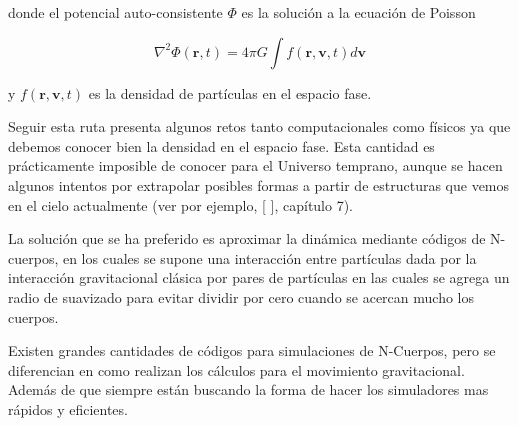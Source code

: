 \noindent donde el potencial auto-consistente $\Phi$ es la solución a la ecuación de Poisson

\begin{equation}
    \nabla^2\Phi(\mathbf{r},t) = 4\pi G \int f(\mathbf{r},\mathbf{v},t)d\mathbf{v}
    \label{eq:PoissonSol}
\end{equation}

\noindent y $f(\mathbf{r},\mathbf{v},t)$ es la densidad de partículas en el espacio fase.





Seguir esta ruta presenta algunos retos tanto computacionales como físicos ya que debemos conocer bien la densidad en el espacio fase. Esta cantidad es prácticamente imposible de conocer para el Universo temprano, aunque se hacen algunos intentos por extrapolar posibles formas a partir de estructuras que vemos en el cielo actualmente (ver por ejemplo, [\cite[Binney]{Binney1988-rs} ], capítulo 7). 

La solución que se ha preferido es aproximar la dinámica mediante códigos de N-cuerpos, en los cuales se supone una interacción entre partículas dada por la interacción gravitacional clásica por pares de partículas en las cuales se agrega un radio de suavizado para evitar dividir por cero cuando se acercan mucho los cuerpos. 

Existen grandes cantidades de códigos para simulaciones de N-Cuerpos, pero se diferencian en como realizan los cálculos para el movimiento gravitacional. Además de que siempre están buscando la forma de hacer los simuladores mas rápidos y eficientes.

